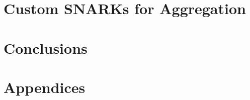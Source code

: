 \documentclass[runningheads]{llncs}
\begin{document}
\section{Custom SNARKs for Aggregation} \label{sec_apk_proofs}

\section{Conclusions}\label{conclusions}


%




\onecolumn
\appendix
\section*{Appendices}




% 









%

\end{document}

